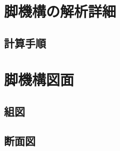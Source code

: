 ﻿%

\appendix
\chapter{脚機構の解析詳細}\label{chapter:付録A}
\section{計算手順}

\chapter{脚機構図面}\label{chapter:付録B}
\section{組図}
\section{断面図}
